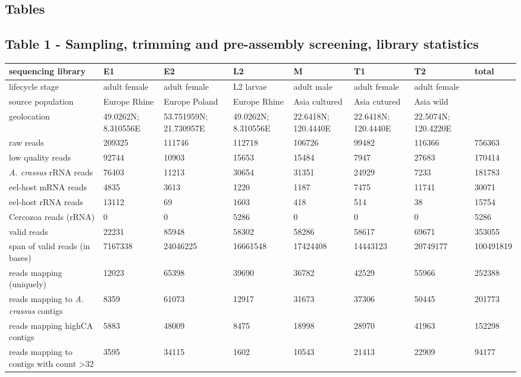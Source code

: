 \documentclass[10pt]{bmc_article}
\newenvironment{bmcformat}{\begin{raggedright}\baselineskip20pt\sloppy\setboolean{publ}{false}}{\end{raggedright}\baselineskip20pt\sloppy}
\begin{document}
\begin{bmcformat}
\newpage

\section*{Tables}
\subsection*{Table 1 - Sampling, trimming and pre-assembly screening,
  library statistics}


\begin{tabular}{p{3.5cm}p{1.5cm}p{1.5cm}p{1.5cm}p{1.5cm}p{1.5cm}p{1.5cm}p{1.5cm}}
   \hline
sequencing library & E1 & E2 & L2 & M & T1 & T2 & total \\ 
   \hline
lifecycle stage & adult female & adult female & L2 larvae & adult male & adult female & adult female &  \\ 
  source population & Europe Rhine & Europe Poland & Europe Rhine & Asia cultured & Asia cutured & Asia wild &  \\ 
  geolocation & 49.0262N; 8.310556E & 53.751959N; 21.730957E & 49.0262N; 8.310556E & 22.6418N; 120.4440E & 22.6418N; 120.4440E & 22.5074N; 120.4220E &  \\ 
  raw reads & 209325 & 111746 & 112718 & 106726 &  99482 & 116366 & 756363 \\ 
  low quality reads & 92744 & 10903 & 15653 & 15484 &  7947 & 27683 & 170414 \\ 
  \textit{A. crassus} rRNA reads & 76403 & 11213 & 30654 & 31351 & 24929 &  7233 & 181783 \\ 
  eel-host mRNA reads &  4835 &  3613 &  1220 &  1187 &  7475 & 11741 & 30071 \\ 
  eel-host rRNA reads & 13112 &    69 &  1603 &   418 &   514 &    38 & 15754 \\ 
  Cercozoa reads (rRNA) &    0 &    0 & 5286 &    0 &    0 &    0 & 5286 \\ 
  valid reads & 22231 & 85948 & 58302 & 58286 & 58617 & 69671 & 353055 \\ 
  span of valid reads (in bases) &  7167338 & 24046225 & 16661548 & 17424408 & 14443123 & 20749177 & 100491819 \\ 
  reads mapping (uniquely) & 12023 & 65398 & 39690 & 36782 & 42529 & 55966 & 252388 \\ 
  reads mapping to \textit{A. crassus} contigs &  8359 & 61073 & 12917 & 31673 & 37306 & 50445 & 201773 \\ 
  reads mapping highCA contigs &  5883 & 48009 &  8475 & 18998 & 28970 & 41963 & 152298 \\ 
  reads mapping to contigs with count >32 &  3595 & 34115 &  1602 & 10543 & 21413 & 22909 & 94177 \\ 
   \hline
\end{tabular}
\newpage


\end{bmcformat}
\end{document}

